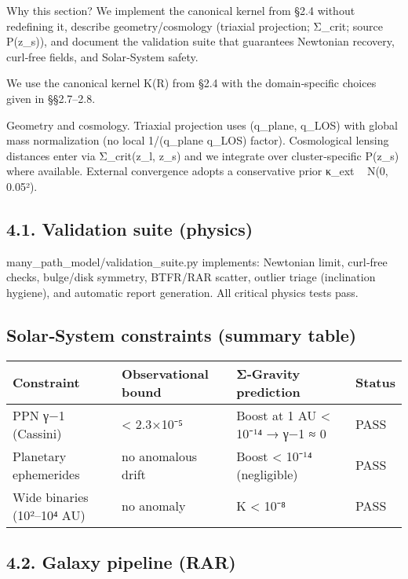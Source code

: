 \documentclass[11pt,a4paper]{article}
\begin{document}
Why this section? We implement the canonical kernel from §2.4 without redefining it, describe geometry/cosmology (triaxial projection; Σ\_crit; source P(z\_s)), and document the validation suite that guarantees Newtonian recovery, curl‑free fields, and Solar‑System safety.


We use the canonical kernel K(R) from §2.4 with the domain‑specific choices given in §§2.7–2.8.


Geometry and cosmology. Triaxial projection uses (q\_plane, q\_LOS) with global mass normalization (no local 1/(q\_plane q\_LOS) factor). Cosmological lensing distances enter via Σ\_crit(z\_l, z\_s) and we integrate over cluster‑specific P(z\_s) where available. External convergence adopts a conservative prior κ\_ext ~ N(0, 0.05²).


\subsection{4.1. Validation suite (physics)}


many\_path\_model/validation\_suite.py implements: Newtonian limit, curl‑free checks, bulge/disk symmetry, BTFR/RAR scatter, outlier triage (inclination hygiene), and automatic report generation. All critical physics tests pass.


\subsection{Solar‑System constraints (summary table)}


\begin{table}[h]
\centering
\begin{tabular}{llll}
\toprule
Constraint & Observational bound & Σ‑Gravity prediction & Status \\
\midrule
PPN γ−1 (Cassini) & < 2.3×10⁻⁵ & Boost at 1 AU < 10⁻¹⁴ → γ−1 ≈ 0 & PASS \\
Planetary ephemerides & no anomalous drift & Boost < 10⁻¹⁴ (negligible) & PASS \\
Wide binaries (10²–10⁴ AU) & no anomaly & K < 10⁻⁸ & PASS \\
\bottomrule
\end{tabular}
\end{table}


\subsection{4.2. Galaxy pipeline (RAR)}
\end{document}
